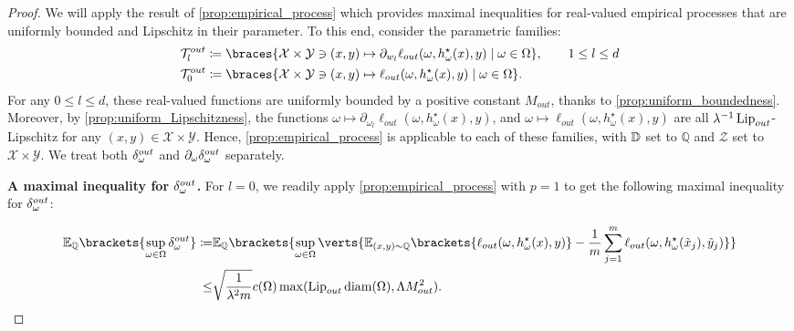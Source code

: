 \begin{proof}
We will apply the result of \cref{prop:empirical_process} which provides maximal inequalities for real-valued empirical processes that are uniformly bounded {and} Lipschitz in their parameter. To this end, consider the parametric families:
\begin{align*}
	\mathcal{T}_{l}^{out} &\coloneqq\braces{\mathcal{X}\times \mathcal{Y}\ni (x,y)\mapsto \partial_{w_l} \ell_{out}(\omega,h_{\omega}^{\star}(x),y)\mid\omega\in \Omega}, \qquad 1\leq l \leq d\\
	\mathcal{T}_{0}^{out} &\coloneqq\braces{\mathcal{X}\times \mathcal{Y}\ni (x,y)\mapsto  \ell_{out}(\omega,h_{\omega}^{\star}(x),y)\mid\omega\in \Omega}.
\end{align*} 
For any $0\leq l\leq d$, these real-valued functions are uniformly bounded by a positive constant $M_{out}$, thanks to {\cref{prop:uniform_boundedness}}. 
Moreover, by {\cref{prop:uniform_Lipschitzness}}, the functions $\omega\mapsto \partial_{\omega_l}\ell_{out}(\omega,h_{\omega}^{\star}(x),y)$, and $\omega\mapsto \ell_{out}(\omega,h_{\omega}^{\star}(x),y)$ are all $\lambda^{-1}\operatorname{Lip}_{out}$-Lipschitz for any $(x,y)\in \mathcal{X}\times \mathcal{Y}$. Hence, \cref{prop:empirical_process} is applicable to each of these families, with $\mathbb{D}$ set to $\mathbb{Q}$ and $\mathcal{Z}$ set to $\mathcal{X}\times \mathcal{Y}$.  We treat both $\delta_\omega^{out}$ and $\partial_{\omega}\delta_\omega^{out}$ separately.

{\bf A maximal inequality for $\delta_\omega^{out}$.}
For $l=0$, we readily apply \cref{prop:empirical_process} with $p=1$ to get the following maximal inequality for $\delta_\omega^{out}$:

\begin{align*}
	\mathbb{E}_{\mathbb{Q}}\brackets{\sup_{\omega\in \Omega} \Dout } \coloneqq &
	\mathbb{E}_{\mathbb{Q}}\brackets{ \sup_{\omega\in \Omega} \verts{ \mathbb{E}_{(x,y)\sim \mathbb{Q}}\brackets{\ell_{out}(\omega,h_{\omega}^{\star}(x),y) } - \frac{1}{m}\sum_{j=1}^m \ell_{out}(\omega,h_{\omega}^{\star}(\tilde{x}_j),\tilde{y}_j) } }\\
	 \leq& \sqrt{\frac{1}{\lambda^2 m}}c(\Omega)\max({\lipout}\diam(\Omega),\Lambda {M_{out}^2}). 
\end{align*}


\end{proof}
